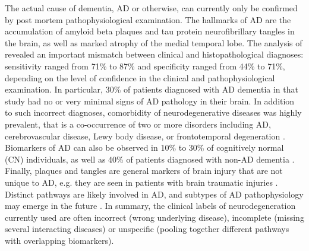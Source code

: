 \documentclass[authoryear]{elsarticle}
\begin{document}
The actual cause of dementia, AD or otherwise, can currently only be confirmed by post mortem pathophysiological examination. The hallmarks of AD are the accumulation of amyloid beta plaques and tau protein neurofibrillary tangles in the brain, as well as marked atrophy of the medial temporal lobe. The analysis of \cite{Beach2012} revealed an important mismatch between clinical and histopathological diagnoses: sensitivity ranged from 71\% to 87\% and specificity ranged from 44\% to 71\%, depending on the level of confidence in the clinical and pathophysiological examination. In particular, 30\% of patients diagnosed with AD dementia in that study had no or very minimal signs of AD pathology in their brain. In addition to such incorrect diagnoses, comorbidity of neurodegenerative diseases was highly prevalent, that is a co-occurrence of two or more disorders including AD, cerebrovascular disease, Lewy body disease, or frontotemporal degeneration \cite{Rabinovici2017,Jellinger2014}. Biomarkers of AD can also be observed in 10\% to 30\% of cognitively normal (CN) individuals, as well as 40\% of patients diagnosed with non-AD dementia \citep{Beach2012}. Finally, plaques and tangles are general markers of brain injury that are not unique to AD, e.g. they are seen in patients with brain traumatic injuries \citep{Marklund2009}. Distinct pathways are likely involved in AD, and subtypes of AD pathophysiology may emerge in the future \citep{Au2015}. In summary, the clinical labels of neurodegeneration currently used are often incorrect (wrong underlying disease), incomplete (missing several interacting diseases) or unspecific (pooling together different pathways with overlapping biomarkers). 
\end{document}
